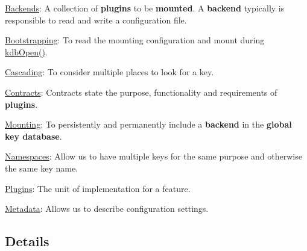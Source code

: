 \begin{DoxyItemize}
\item \hyperlink{md_doc_help_elektra-backends_doc_help_elektra-backends_md}{Backends}\+: A collection of {\bfseries plugins} to be {\bfseries mounted}. A {\bfseries backend} typically is responsible to read and write a configuration file.
\item \hyperlink{md_doc_help_elektra-bootstrapping_doc_help_elektra-bootstrapping_md}{Bootstrapping}\+: To read the mounting configuration and mount during {\ttfamily \hyperlink{group__kdb_ga6808defe5870f328dd17910aacbdc6ca}{kdb\+Open()}}.
\item \hyperlink{md_doc_help_elektra-cascading_doc_help_elektra-cascading_md}{Cascading}\+: To consider multiple places to look for a key.
\item \hyperlink{md_doc_help_elektra-contracts_doc_help_elektra-contracts_md}{Contracts}\+: Contracts state the purpose, functionality and requirements of {\bfseries plugins}.
\item \hyperlink{md_doc_help_elektra-mounting_doc_help_elektra-mounting_md}{Mounting}\+: To persistently and permanently include a {\bfseries backend} in the {\bfseries global key database}.
\item \hyperlink{md_doc_help_elektra-namespaces_doc_help_elektra-namespaces_md}{Namespaces}\+: Allow us to have multiple keys for the same purpose and otherwise the same key name.
\item \hyperlink{md_src_plugins_README_src_plugins_README_md}{Plugins}\+: The unit of implementation for a feature.
\item \hyperlink{md_doc_help_elektra-metadata_doc_help_elektra-metadata_md}{Metadata}\+: Allows us to describe configuration settings.
\end{DoxyItemize}

\subsection*{Details}


